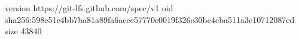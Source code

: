 version https://git-lfs.github.com/spec/v1
oid sha256:598e51c4bb7ba81a89fa6acce57770e0019f326c30be4cba511a3c10712087ed
size 43840
